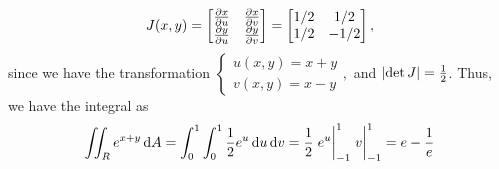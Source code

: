 \documentclass[8pt]{article}
\begin{document}
\begin{Answer}[number=22]
  \[
    J(x,y)={\begin{bmatrix}
      \pdv{x}{u}&\pdv{x}{v}\\
      \pdv{y}{u}&\pdv{y}{v}
    \end{bmatrix}}=
    \begin{bmatrix}1/2&1/2\\1/2&-1/2\end{bmatrix},
  \]
  since we have the transformation
  \(
    \begin{cases}
      u(x,y) = x+y \\
      v(x,y) = x-y
    \end{cases},
  \)
  and $\abs{\det J} = \frac{1}{2}$.
  Thus, we have the integral as
  \[
    \iint_R e^{x+y} \dd{A} = \int_0^1\int_0^1\frac{1}{2} e^u\dd{u}\dd{v} =
    \frac{1}{2}\eval{e^u}_{-1}^1 \eval{v}_{-1}^1 = e - \frac{1}{e}
  \]
\end{Answer}
\end{document}
